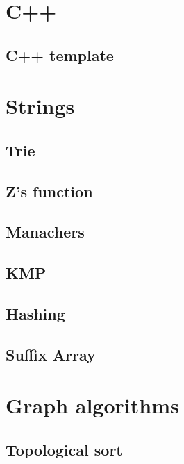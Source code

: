 \section{C++}
\subsection{C++ template}
\raggedbottom
\hrulefill

\section{Strings}
\subsection{Trie}
\raggedbottom
\hrulefill
\subsection{Z's function}
\raggedbottom
\hrulefill
\subsection{Manachers}
\raggedbottom
\hrulefill
\subsection{KMP}
\raggedbottom
\hrulefill
\subsection{Hashing}
\raggedbottom
\hrulefill
\subsection{Suffix Array}
\raggedbottom
\hrulefill

\section{Graph algorithms}
\subsection{Topological sort}
\raggedbottom
\hrulefill
